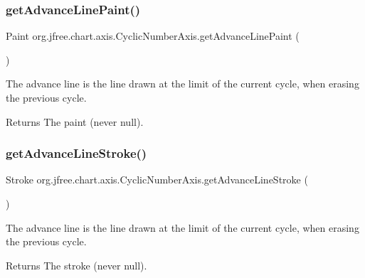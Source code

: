 \subsubsection{\texorpdfstring{get\+Advance\+Line\+Paint()}{getAdvanceLinePaint()}}
{\footnotesize\ttfamily Paint org.\+jfree.\+chart.\+axis.\+Cyclic\+Number\+Axis.\+get\+Advance\+Line\+Paint (\begin{DoxyParamCaption}{ }\end{DoxyParamCaption})}

The advance line is the line drawn at the limit of the current cycle, when erasing the previous cycle.

\begin{DoxyReturn}{Returns}
The paint (never {\ttfamily null}). 
\end{DoxyReturn}
\mbox{\label{classorg_1_1jfree_1_1chart_1_1axis_1_1_cyclic_number_axis_ae97337534954e16551cca918999a33fd}} 
\subsubsection{\texorpdfstring{get\+Advance\+Line\+Stroke()}{getAdvanceLineStroke()}}
{\footnotesize\ttfamily Stroke org.\+jfree.\+chart.\+axis.\+Cyclic\+Number\+Axis.\+get\+Advance\+Line\+Stroke (\begin{DoxyParamCaption}{ }\end{DoxyParamCaption})}

The advance line is the line drawn at the limit of the current cycle, when erasing the previous cycle.

\begin{DoxyReturn}{Returns}
The stroke (never {\ttfamily null}). 
\end{DoxyReturn}
\mbox{\label{classorg_1_1jfree_1_1chart_1_1axis_1_1_cyclic_number_axis_af988de5e084906aebb81e7f12599d827}} 
